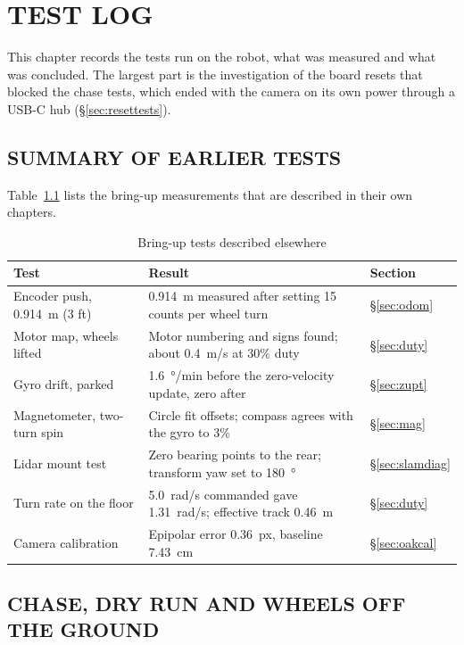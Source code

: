 \chapter{TEST LOG}
\label{ch:tests}

This chapter records the tests run on the robot, what was measured and what
was concluded. The largest part is the investigation of the board resets
that blocked the chase tests, which ended with the camera on its own power
through a USB-C hub (\S\ref{sec:resettests}).

\section{SUMMARY OF EARLIER TESTS}

Table~\ref{tab:earliertests} lists the bring-up measurements that are
described in their own chapters.

\begin{table}[htbp]
\centering
\caption{Bring-up tests described elsewhere}
\label{tab:earliertests}
\small
\begin{tabularx}{\linewidth}{>{\raggedright\arraybackslash}p{38mm}>{\raggedright\arraybackslash}X>{\raggedright\arraybackslash}p{18mm}}
\toprule
Test & Result & Section \\
\midrule
Encoder push, \SI{0.914}{m} (3 ft) & \SI{0.914}{m} measured after setting 15 counts per wheel turn & \S\ref{sec:odom} \\
Motor map, wheels lifted & Motor numbering and signs found; about \SI{0.4}{m/s} at 30\% duty & \S\ref{sec:duty} \\
Gyro drift, parked & \SI{1.6}{\degree/min} before the zero-velocity update, zero after & \S\ref{sec:zupt} \\
Magnetometer, two-turn spin & Circle fit offsets; compass agrees with the gyro to 3\% & \S\ref{sec:mag} \\
Lidar mount test & Zero bearing points to the rear; transform yaw set to \SI{180}{\degree} & \S\ref{sec:slamdiag} \\
Turn rate on the floor & \SI{5.0}{rad/s} commanded gave \SI{1.31}{rad/s}; effective track \SI{0.46}{m} & \S\ref{sec:duty} \\
Camera calibration & Epipolar error 0.36~px, baseline \SI{7.43}{cm} & \S\ref{sec:oakcal} \\
\bottomrule
\end{tabularx}
\end{table}

\section{CHASE, DRY RUN AND WHEELS OFF THE GROUND}
\label{sec:chasetest}

